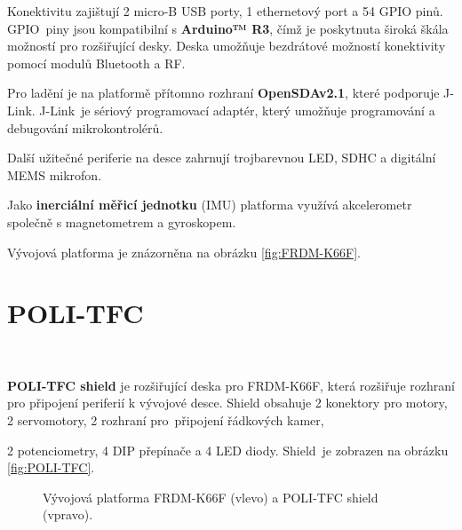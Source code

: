 Konektivitu zajištují 2 micro-B USB porty, 1 ethernetový port a 54 GPIO pinů.
GPIO~piny jsou kompatibilní s \textbf{Arduino™ R3}, čímž je poskytnuta široká škála
možností pro rozšiřující desky. Deska umožňuje bezdrátové možností konektivity
pomocí modulů Bluetooth a RF.

Pro ladění je na platformě přítomno rozhraní \textbf{OpenSDAv2.1}, které podporuje
J-Link. J-Link~je sériový programovací adaptér, který umožňuje programování a
debugování mikrokontrolérů.

Další užitečné periferie na desce zahrnují trojbarevnou LED, SDHC a digitální MEMS
mikrofon.

Jako \textbf{inerciální měřicí jednotku} (IMU) platforma využívá akcelerometr
společně s magnetometrem a gyroskopem\cite{frdmk66UserGuide}.

Vývojová platforma je znázorněna na obrázku \ref{fig:FRDM-K66F}.

\section{POLI-TFC}
\label{sec:POLI-TFC}\

\textbf{POLI-TFC shield} je rozšiřující deska pro FRDM-K66F, která rozšiřuje
rozhraní pro připojení periferií k vývojové desce. Shield obsahuje 2 konektory
pro motory, 2 servomotory, 2 rozhraní pro~připojení řádkových kamer,

2 potenciometry, 4 DIP přepínače a 4 LED diody. Shield~je zobrazen na obrázku
\ref{fig:POLI-TFC}.

\begin{figure}[ht]
	\centering
	\hfill
	\caption{Vývojová platforma FRDM-K66F (vlevo) a POLI-TFC shield (vpravo).}
\end{figure}

\endinput
